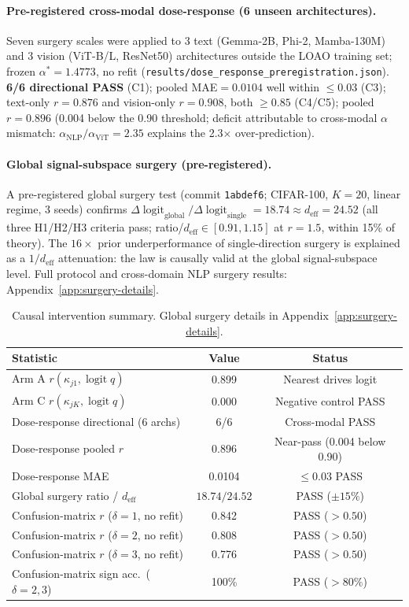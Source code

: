 \documentclass{article}
\DeclareMathOperator{\logit}{logit}
\begin{document}
\paragraph{Pre-registered cross-modal dose-response (6 unseen architectures).}
Seven surgery scales were applied to 3 text (Gemma-2B, Phi-2, Mamba-130M) and 3 vision (ViT-B/L, ResNet50) architectures outside the LOAO training set; frozen $\alpha^*=1.4773$, no refit (\texttt{results/dose\_response\_preregistration.json}).
\textbf{6/6 directional PASS} (C1); pooled MAE$=0.0104$ well within $\leq0.03$ (C3); text-only $r=0.876$ and vision-only $r=0.908$, both $\geq0.85$ (C4/C5); pooled $r=0.896$ (0.004 below the 0.90 threshold; deficit attributable to cross-modal $\alpha$ mismatch: $\alpha_\mathrm{NLP}/\alpha_\mathrm{ViT}=2.35$ explains the 2.3$\times$ over-prediction).

\paragraph{Global signal-subspace surgery (pre-registered).}
A pre-registered global surgery test (commit \texttt{1abdef6}; CIFAR-100, $K=20$, linear regime,
3 seeds) confirms $\Delta\logit_{\mathrm{global}}/\Delta\logit_{\mathrm{single}} = 18.74 \approx d_{\mathrm{eff}} = 24.52$ (all three H1/H2/H3 criteria pass; ratio/$d_\mathrm{eff}\in[0.91,1.15]$ at $r=1.5$, within 15\% of theory).
The $16\times$ prior underperformance of single-direction surgery is explained as a $1/d_\mathrm{eff}$ attenuation: the law is causally valid at the global signal-subspace level.
Full protocol and cross-domain NLP surgery results: Appendix~\ref{app:surgery-details}.

\begin{table}[t]
\centering
\caption{Causal intervention summary. Global surgery details in Appendix~\ref{app:surgery-details}.}
\label{tab:causal}
\small
\begin{tabular}{lcc}
\toprule
Statistic & Value & Status \\
\midrule
Arm A $r(\kappa_{j1},\logit q)$ & 0.899 & Nearest drives logit \\
Arm C $r(\kappa_{jK},\logit q)$ & 0.000 & Negative control PASS \\
Dose-response directional (6 archs) & 6/6 & Cross-modal PASS \\
Dose-response pooled $r$ & 0.896 & Near-pass (0.004 below 0.90) \\
Dose-response MAE & 0.0104 & $\leq 0.03$ PASS \\
Global surgery ratio / $d_{\mathrm{eff}}$ & $18.74/24.52$ & PASS ($\pm15\%$) \\
\midrule
Confusion-matrix $r$ ($\delta=1$, no refit) & 0.842 & PASS ($>0.50$) \\
Confusion-matrix $r$ ($\delta=2$, no refit) & 0.808 & PASS ($>0.50$) \\
Confusion-matrix $r$ ($\delta=3$, no refit) & 0.776 & PASS ($>0.50$) \\
Confusion-matrix sign acc.\ ($\delta=2,3$) & 100\% & PASS ($>80\%$) \\
\bottomrule
\end{tabular}
\end{table}
\end{document}
